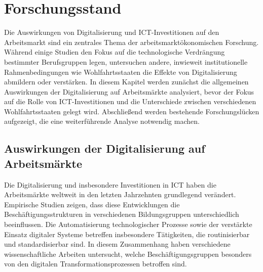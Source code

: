 
\section{Forschungsstand}

Die Auswirkungen von Digitalisierung und \ac{ICT}-Investitionen auf den Arbeitsmarkt sind 
ein zentrales Thema der arbeitsmarktökonomischen Forschung. Während einige Studien den 
Fokus auf die technologische Verdrängung bestimmter Berufsgruppen legen, untersuchen 
andere, inwieweit institutionelle Rahmenbedingungen wie Wohlfahrtsstaaten die Effekte von 
Digitalisierung abmildern oder verstärken. In diesem Kapitel werden zunächst die 
allgemeinen Auswirkungen der Digitalisierung auf Arbeitsmärkte analysiert, bevor der Fokus 
auf die Rolle von \ac{ICT}-Investitionen und die Unterschiede zwischen verschiedenen 
Wohlfahrtsstaaten gelegt wird. Abschließend werden bestehende Forschungslücken aufgezeigt, 
die eine weiterführende Analyse notwendig machen.


\subsection{Auswirkungen der Digitalisierung auf Arbeitsmärkte}

Die Digitalisierung und insbesondere Investitionen in \ac{ICT} haben die Arbeitsmärkte 
weltweit in den letzten Jahrzehnten grundlegend verändert. Empirische Studien zeigen, dass 
diese Entwicklungen die Beschäftigungsstrukturen in verschiedenen Bildungsgruppen 
unterschiedlich beeinflussen. Die Automatisierung technologischer Prozesse sowie der 
verstärkte Einsatz digitaler Systeme betreffen insbesondere Tätigkeiten, die routinisierbar 
und standardisierbar sind. In diesem Zusammenhang haben verschiedene wissenschaftliche 
Arbeiten untersucht, welche Beschäftigungsgruppen besonders von den digitalen 
Transformationsprozessen betroffen sind.

